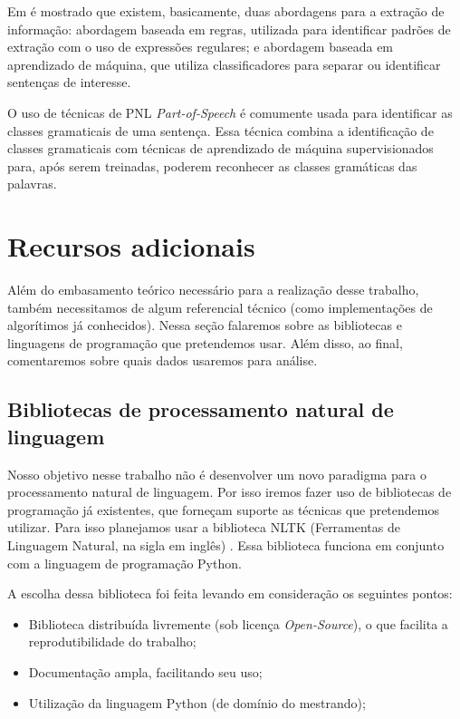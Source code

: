 \documentclass[
	12pt,				%
	openright,			%
	twoside,			%
	a4paper,			%
	english,			%
	spanish,			%
	brazil,				%
	]{abntex2}
\begin{document}
Em \cite{duque2012processo} é mostrado que existem, basicamente, duas abordagens para a extração de informação: abordagem baseada em regras, utilizada para identificar padrões de extração com o uso de expressões regulares; e abordagem baseada em aprendizado de máquina, que utiliza classificadores para separar ou identificar sentenças de interesse.

O uso de técnicas de PNL \emph{Part-of-Speech} é comumente usada para identificar as classes gramaticais de uma sentença. Essa técnica combina a identificação de classes gramaticais com técnicas de aprendizado de máquina supervisionados para, após serem treinadas, poderem reconhecer as classes gramáticas das palavras.

\section{Recursos adicionais}
Além do embasamento teórico necessário para a realização desse trabalho, também necessitamos de algum referencial técnico (como implementações de algorítimos já conhecidos). Nessa seção falaremos sobre as bibliotecas e linguagens de programação que pretendemos usar. Além disso, ao final, comentaremos sobre quais dados usaremos para análise.

\subsection{Bibliotecas de processamento natural de linguagem}

Nosso objetivo nesse trabalho não é desenvolver um novo paradigma para o processamento natural de linguagem. Por isso iremos fazer uso de bibliotecas de programação já existentes, que forneçam suporte as técnicas que pretendemos utilizar. Para isso planejamos usar a biblioteca NLTK (Ferramentas de Linguagem Natural, na sigla em inglês) \cite{bird2009natural}. Essa biblioteca funciona em conjunto com a linguagem de programação Python.

A escolha dessa biblioteca foi feita levando em consideração os seguintes pontos:

\begin{itemize}
	\item Biblioteca distribuída livremente (sob licença \emph{Open-Source}), o que facilita a reprodutibilidade do trabalho;
	\item Documentação ampla, facilitando seu uso;
	\item Utilização da linguagem Python (de domínio do mestrando);
\end{itemize}
\end{document}
